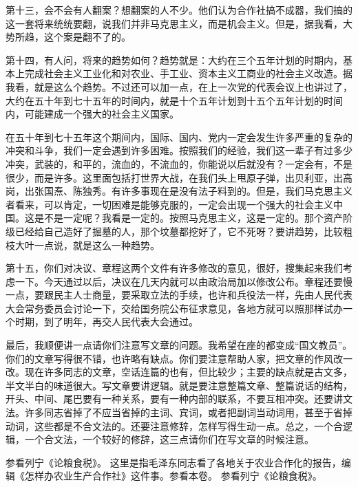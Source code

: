 第十三，会不会有人翻案？想翻案的人不少。他们认为合作社搞不成器，我们搞的这一套将来统统要翻，说我们并非马克思主义，而是机会主义。但是，据我看，大势所趋，这个案是翻不了的。

第十四，有人问，将来的趋势如何？趋势就是：大约在三个五年计划的时期内，基本上完成社会主义工业化和对农业、手工业、资本主义工商业的社会主义改造。据我看，就是这么个趋势。不过还可以加一点，在上一次党的代表会议上也讲过了，大约在五十年到七十五年的时间内，就是十个五年计划到十五个五年计划的时间内，可能建成一个强大的社会主义国家。

在五十年到七十五年这个期间内，国际、国内、党内一定会发生许多严重的复杂的冲突和斗争，我们一定会遇到许多困难。按照我们的经验，我们这一辈子有过多少冲突，武装的，和平的，流血的，不流血的，你能说以后就没有？一定会有，不是很少，而是许多。这里面包括打世界大战，在我们头上甩原子弹，出贝利亚，出高岗，出张国焘、陈独秀。有许多事现在是没有法子料到的。但是，我们马克思主义者看来，可以肯定，一切困难是能够克服的，一定会出现一个强大的社会主义中国。这是不是一定呢？我看是一定的。按照马克思主义，这是一定的。那个资产阶级已经给自己造好了掘墓的人，那个坟墓都挖好了，它不死呀？要讲趋势，比较粗枝大叶一点说，就是这么一种趋势。

第十五，你们对决议、章程这两个文件有许多修改的意见，很好，搜集起来我们考虑一下。今天通过以后，决议在几天内就可以由政治局加以修改公布。章程还要慢一点，要跟民主人士商量，要采取立法的手续，也许和兵役法一样，先由人民代表大会常务委员会讨论一下，交给国务院公布征求意见，各地方就可以照那样试办一个时期，到了明年，再交人民代表大会通过。

最后，我顺便讲一点请你们注意写文章的问题。我希望在座的都变成“国文教员”。你们的文章写得很不错，也许略有缺点。你们要注意帮助人家，把文章的作风改一改。现在许多同志的文章，空话连篇的也有，但比较少；主要的缺点就是古文多，半文半白的味道很大。写文章要讲逻辑。就是要注意整篇文章、整篇说话的结构，开头、中间、尾巴要有一种关系，要有一种内部的联系，不要互相冲突。还要讲文法。许多同志省掉了不应当省掉的主词、宾词，或者把副词当动词用，甚至于省掉动词，这些都是不合文法的。还要注意修辞，怎样写得生动一点。总之，一个合逻辑，一个合文法，一个较好的修辞，这三点请你们在写文章的时候注意。


\begin{maonote}
参看列宁《论粮食税》。
这里是指毛泽东同志看了各地关于农业合作化的报告，编辑《怎样办农业生产合作社》这件事。参看本卷。
参看列宁《论粮食税》。
\end{maonote}
